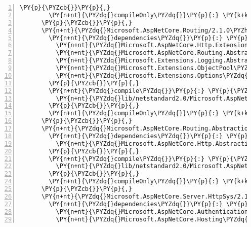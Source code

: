 \begin{Verbatim}[commandchars=\\\{\},numbers=left,firstnumber=1,stepnumber=1,numberblanklines=0]
        \PY{p}{\PYZcb{}}\PY{p}{,}
        \PY{n+nt}{\PYZdq{}compileOnly\PYZdq{}}\PY{p}{:} \PY{k+kc}{true}
      \PY{p}{\PYZcb{}}\PY{p}{,}
      \PY{n+nt}{\PYZdq{}Microsoft.AspNetCore.Routing/2.1.0\PYZhy{}rc1\PYZhy{}final\PYZdq{}}\PY{p}{:} \PY{p}{\PYZob{}}
        \PY{n+nt}{\PYZdq{}dependencies\PYZdq{}}\PY{p}{:} \PY{p}{\PYZob{}}
          \PY{n+nt}{\PYZdq{}Microsoft.AspNetCore.Http.Extensions\PYZdq{}}\PY{p}{:} \PY{l+s+s2}{\PYZdq{}2.1.0\PYZhy{}rc1\PYZhy{}final\PYZdq{}}\PY{p}{,}
          \PY{n+nt}{\PYZdq{}Microsoft.AspNetCore.Routing.Abstractions\PYZdq{}}\PY{p}{:} \PY{l+s+s2}{\PYZdq{}2.1.0\PYZhy{}rc1\PYZhy{}final\PYZdq{}}\PY{p}{,}
          \PY{n+nt}{\PYZdq{}Microsoft.Extensions.Logging.Abstractions\PYZdq{}}\PY{p}{:} \PY{l+s+s2}{\PYZdq{}2.1.0\PYZhy{}rc1\PYZhy{}final\PYZdq{}}\PY{p}{,}
          \PY{n+nt}{\PYZdq{}Microsoft.Extensions.ObjectPool\PYZdq{}}\PY{p}{:} \PY{l+s+s2}{\PYZdq{}2.1.0\PYZhy{}rc1\PYZhy{}final\PYZdq{}}\PY{p}{,}
          \PY{n+nt}{\PYZdq{}Microsoft.Extensions.Options\PYZdq{}}\PY{p}{:} \PY{l+s+s2}{\PYZdq{}2.1.0\PYZhy{}rc1\PYZhy{}final\PYZdq{}}
        \PY{p}{\PYZcb{}}\PY{p}{,}
        \PY{n+nt}{\PYZdq{}compile\PYZdq{}}\PY{p}{:} \PY{p}{\PYZob{}}
          \PY{n+nt}{\PYZdq{}lib/netstandard2.0/Microsoft.AspNetCore.Routing.dll\PYZdq{}}\PY{p}{:} \PY{p}{\PYZob{}}\PY{p}{\PYZcb{}}
        \PY{p}{\PYZcb{}}\PY{p}{,}
        \PY{n+nt}{\PYZdq{}compileOnly\PYZdq{}}\PY{p}{:} \PY{k+kc}{true}
      \PY{p}{\PYZcb{}}\PY{p}{,}
      \PY{n+nt}{\PYZdq{}Microsoft.AspNetCore.Routing.Abstractions/2.1.0\PYZhy{}rc1\PYZhy{}final\PYZdq{}}\PY{p}{:} \PY{p}{\PYZob{}}
        \PY{n+nt}{\PYZdq{}dependencies\PYZdq{}}\PY{p}{:} \PY{p}{\PYZob{}}
          \PY{n+nt}{\PYZdq{}Microsoft.AspNetCore.Http.Abstractions\PYZdq{}}\PY{p}{:} \PY{l+s+s2}{\PYZdq{}2.1.0\PYZhy{}rc1\PYZhy{}final\PYZdq{}}
        \PY{p}{\PYZcb{}}\PY{p}{,}
        \PY{n+nt}{\PYZdq{}compile\PYZdq{}}\PY{p}{:} \PY{p}{\PYZob{}}
          \PY{n+nt}{\PYZdq{}lib/netstandard2.0/Microsoft.AspNetCore.Routing.Abstractions.dll\PYZdq{}}\PY{p}{:} \PY{p}{\PYZob{}}\PY{p}{\PYZcb{}}
        \PY{p}{\PYZcb{}}\PY{p}{,}
        \PY{n+nt}{\PYZdq{}compileOnly\PYZdq{}}\PY{p}{:} \PY{k+kc}{true}
      \PY{p}{\PYZcb{}}\PY{p}{,}
      \PY{n+nt}{\PYZdq{}Microsoft.AspNetCore.Server.HttpSys/2.1.0\PYZhy{}rc1\PYZhy{}final\PYZdq{}}\PY{p}{:} \PY{p}{\PYZob{}}
        \PY{n+nt}{\PYZdq{}dependencies\PYZdq{}}\PY{p}{:} \PY{p}{\PYZob{}}
          \PY{n+nt}{\PYZdq{}Microsoft.AspNetCore.Authentication.Core\PYZdq{}}\PY{p}{:} \PY{l+s+s2}{\PYZdq{}2.1.0\PYZhy{}rc1\PYZhy{}final\PYZdq{}}\PY{p}{,}
          \PY{n+nt}{\PYZdq{}Microsoft.AspNetCore.Hosting\PYZdq{}}\PY{p}{:} \PY{l+s+s2}{\PYZdq{}2.1.0\PYZhy{}rc1\PYZhy{}final\PYZdq{}}\PY{p}{,}

\end{Verbatim}

